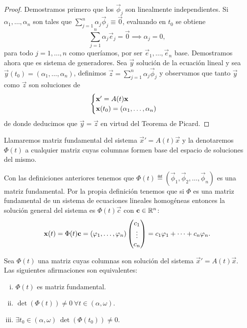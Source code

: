 \documentclass[../ecuaciones_diferenciales.tex]{subfiles}
\begin{document}
\begin{proof}
	Demostramos primero que los \(\vec{\phi}_j\) son linealmente independientes.
	Si \(\alpha_1, \dots, \alpha_n\) son tales que
	\(\sum_{j = 1}^n \alpha_j \vec{\phi}_j \equiv \vec{0}\),
	evaluando en \(t_0\) se obtiene
	\[\sum_{j = 1}^n \alpha_j \vec{e}_j = \vec{0} \implies \alpha_j = 0,\]
	para todo \(j = 1, \dots, n\) como queríamos, por ser
	\(\vec{e}_1, \dots, \vec{e}_n\) base.
	Demostramos ahora que es sistema de generadores. Sea \(\vec{y}\) solución
	de la ecuación lineal y sea
	\(\vec{y}(t_0) = (\alpha_1, \dots, \alpha_n)\),
	definimos \(\vec{z} = \sum_{j = 1}^n \alpha_j \vec{\phi}_j\) y observamos
	que tanto \(\vec{y}\) como \(\vec{z}\) son soluciones de
	\[\begin{cases}
		\mathbf{x}' = A(t)\mathbf{x} \\
		\mathbf{x}(t_0) = (\alpha_1, \dots, \alpha_n)\end{cases}\]
	de donde deducimos que \(\vec{y} = \vec{z}\) en virtud del
	Teorema de Picard.
\end{proof}

\begin{definition}
	Llamaremos matriz fundamental del sistema
	\(\vec{x}' = A(t)\vec{x}\) y la denotaremos
	\(\Phi(t)\) a cualquier matriz cuyas columnas formen base del espacio de
	soluciones del mismo.
\end{definition}

Con las definiciones anteriores tenemos que
\(\Phi(t) \eqdef (\vec{\phi}_1, \vec{\phi}_2, \dots, \vec{\phi}_n)\) es una matriz
fundamental. Por la propia definición tenemos que si \(\Phi\) es una matriz
fundamental de un sistema de ecuaciones lineales homogéneas entonces la solución
general del sistema es \(\Phi(t)\vec{c}\) con \(\mathbf{c} \in \mathbb{R}^n\):
\[\mathbf{x}(t) = \Phi(t) \mathbf{c}
	= (\mathbf{\varphi}_1, \dots, \mathbf{\varphi}_n) \begin{pmatrix}c_1 \\ \vdots \\ c_n\end{pmatrix} =
	c_1\mathbf{\varphi}_1 + \cdots + c_n\mathbf{\varphi}_n.\]

\begin{proposition}
	Sea \(\Phi(t)\) una matriz cuyas columnas son solución del sistema
	\(\vec{x}' = A(t)\vec{x}\). Las siguientes afirmaciones son equivalentes:
	\begin{multicols}{2}
	\begin{enumerate}[(i)]
		\item \(\Phi(t)\) es matriz fundamental.

		\item \(\det(\Phi(t)) \neq 0 \ \forall t \in (\alpha, \omega)\).

		\item \(\exists t_0 \in (\alpha, \omega) \ \det(\Phi(t_0)) \neq 0\).
	\end{enumerate}
	\end{multicols}
\end{proposition}
\end{document}
